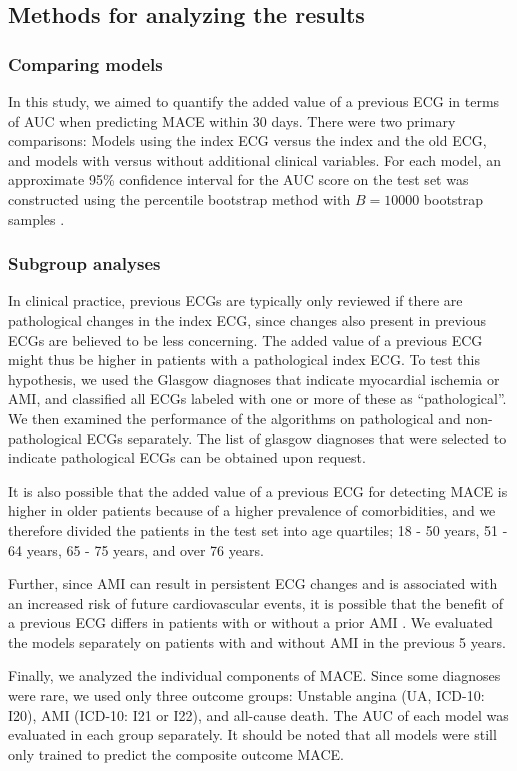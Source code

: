 \documentclass[preprint]{elsarticle}
\begin{document}
\subsection{Methods for analyzing the results}
\subsubsection{Comparing models}
In this study, we aimed to quantify the added value of a previous ECG in terms of AUC  when predicting MACE within 30 days. There were two primary comparisons: Models using the index ECG versus the index and the old ECG, and models with versus without additional clinical variables. For each model, an approximate 95\% confidence interval for the AUC score on the test set was constructed using the percentile bootstrap method with $B=10000$ bootstrap samples \citep{efron1981}.

\subsubsection{Subgroup analyses}
In clinical practice, previous ECGs are typically only reviewed if there are pathological changes in the index ECG, since changes also present in previous ECGs are believed to be less concerning. The added value of a previous ECG might thus be higher in patients with a pathological index ECG. To test this hypothesis, we used the Glasgow diagnoses that indicate myocardial ischemia or AMI, and classified all ECGs labeled with one or more of these as ``pathological''. We then examined the performance of the algorithms on pathological and non-pathological ECGs separately. The list of glasgow diagnoses that were selected to indicate pathological ECGs can be obtained upon request. 

It is also possible that the added value of a previous ECG for detecting MACE is higher in older patients because of a higher prevalence of comorbidities, and we therefore divided the patients in the test set into age quartiles; 18 - 50 years, 51 - 64 years, 65 - 75 years, and over 76 years.

Further, since AMI can result in persistent ECG changes and is associated with an increased risk of future cardiovascular events, it is possible that the benefit of a previous ECG differs in patients with or without a prior AMI \citep{strom2007,sawai2017}. We evaluated the models separately on patients with and without AMI in the previous 5 years.

Finally, we analyzed the individual components of MACE. Since some diagnoses were rare, we used only three outcome groups: Unstable angina (UA, ICD-10: I20), AMI (ICD-10: I21 or I22), and all-cause death. The AUC of each model was evaluated in each group separately. It should be noted that all models were still only trained to predict the composite outcome MACE.
\end{document}
